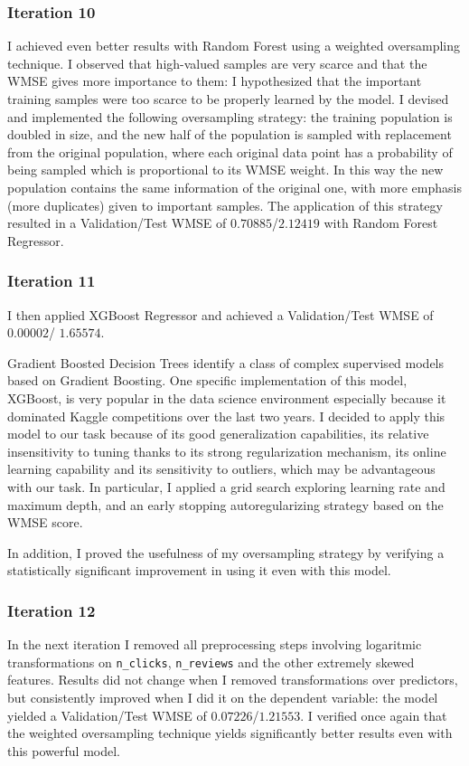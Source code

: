 \documentclass[preprint,12pt,3p]{elsarticle}
\begin{document}
\subsubsection{Iteration 10}
I achieved even better results with Random Forest using a weighted oversampling technique. I observed that high-valued samples are very scarce and that the WMSE gives more importance to them: I hypothesized that the important training samples were too scarce to be properly learned by the model. I devised and implemented the following oversampling strategy: the training population is doubled in size, and the new half of the population is sampled with replacement from the original population, where each original data point has a probability of being sampled which is proportional to its WMSE weight. In this way the new population contains the same information of the original one, with more emphasis (more duplicates) given to important samples. The application of this strategy resulted in a Validation/Test WMSE of $0.70885$/$2.12419$ with Random Forest Regressor.

\subsubsection{Iteration 11}
I then applied XGBoost Regressor and achieved a Validation/Test WMSE of $0.00002$/ $1.65574$.

Gradient Boosted Decision Trees identify a class of complex supervised models based on Gradient Boosting. One specific implementation of this model, XGBoost, is very popular in the data science environment especially because it dominated Kaggle competitions over the last two years. I decided to apply this model to our task because of its good generalization capabilities, its relative insensitivity to tuning thanks to its strong regularization mechanism, its online learning capability and its sensitivity to outliers, which may be advantageous with our task. In particular, I applied a grid search exploring learning rate and maximum depth, and an early stopping autoregularizing strategy based on the WMSE score. 

In addition, I proved the usefulness of my oversampling strategy by verifying a statistically significant improvement in using it even with this model.

\subsubsection{Iteration 12}
In the next iteration I removed all preprocessing steps involving logaritmic transformations on \verb|n_clicks|, \verb|n_reviews| and the other extremely skewed features. Results did not change when I removed transformations over predictors, but consistently improved when I did it on the dependent variable: the model yielded a Validation/Test WMSE of $0.07226$/$1.21553$.
I verified once again that the weighted oversampling technique yields significantly better results even with this powerful model.
\end{document}
